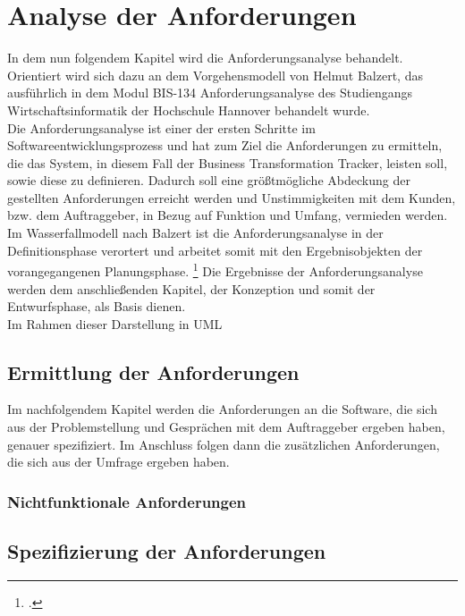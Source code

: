 \section{Analyse der Anforderungen}
In dem nun folgendem Kapitel wird die Anforderungsanalyse behandelt. Orientiert wird sich dazu an dem Vorgehensmodell von Helmut Balzert, das ausführlich in dem Modul BIS-134 Anforderungsanalyse des Studiengangs Wirtschaftsinformatik der Hochschule Hannover behandelt wurde.\\Die Anforderungsanalyse ist einer der ersten Schritte im Softwareentwicklungsprozess und hat zum Ziel die Anforderungen zu ermitteln, die das System, in diesem Fall der Business Transformation Tracker, leisten soll, sowie diese zu definieren. Dadurch soll eine größtmögliche Abdeckung der gestellten Anforderungen erreicht werden und Unstimmigkeiten mit dem Kunden, bzw. dem Auftraggeber, in Bezug auf Funktion und Umfang, vermieden werden. Im Wasserfallmodell nach Balzert ist die Anforderungsanalyse in der Definitionsphase verortert und arbeitet somit mit den Ergebnisobjekten der vorangegangenen Planungsphase. \footcite[Vgl.][S. 100 ff.]{balzert} Die Ergebnisse der Anforderungsanalyse werden dem anschließenden Kapitel, der Konzeption und somit der Entwurfsphase, als Basis dienen.\\
Im Rahmen dieser    Darstellung in UML


\subsection{Ermittlung der Anforderungen}
Im nachfolgendem Kapitel werden die Anforderungen an die Software, die sich aus der Problemstellung und Gesprächen mit dem Auftraggeber ergeben haben, genauer spezifiziert. Im Anschluss folgen dann die zusätzlichen Anforderungen, die sich aus der Umfrage ergeben haben.

\subsubsection{Nichtfunktionale Anforderungen}

\subsection{Spezifizierung der Anforderungen}

